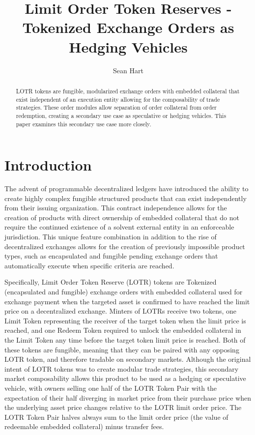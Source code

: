 \documentclass[12pt]{article}
\title{Limit Order Token Reserves - Tokenized Exchange Orders as Hedging Vehicles}
\author{Sean Hart}
\begin{document}
   \maketitle

   \begin{abstract}
      LOTR tokens are fungible, modularized exchange orders with embedded collateral that exist independent of an execution entity allowing for the composability of trade strategies. These order modules allow separation of order collateral from order redemption, creating a secondary use case as speculative or hedging vehicles. This paper examines this secondary use case more closely.
   \end{abstract}

   \section*{Introduction}
   The advent of programmable decentralized ledgers have introduced the ability to create highly complex fungible structured products that can exist independently from their issuing organization. This contract independence allows for the creation of products with direct ownership of embedded collateral that do not require the continued existence of a solvent external entity in an enforceable jurisdiction. This unique feature combination in addition to the rise of decentralized exchanges allows for the creation of previously impossible product types, such as encapsulated and fungible pending exchange orders that automatically execute when specific criteria are reached.

   Specifically, Limit Order Token Reserve (LOTR) tokens are Tokenized (encapsulated and fungible) exchange orders with embedded collateral used for exchange payment when the targeted asset is confirmed to have reached the limit price on a decentralized exchange. Minters of LOTRs receive two tokens, one Limit Token representing the receiver of the target token when the limit price is reached, and one Redeem Token required to unlock the embedded collateral in the Limit Token any time before the target token limit price is reached. Both of these tokens are fungible, meaning that they can be paired with any opposing LOTR token, and therefore tradable on secondary markets. Although the original intent of LOTR tokens was to create modular trade strategies, this secondary market composability allows this product to be used as a hedging or speculative vehicle, with owners selling one half of the LOTR Token Pair with the expectation of their half diverging in market price from their purchase price when the underlying asset price changes relative to the LOTR limit order price. The LOTR Token Pair halves always sum to the limit order price (the value of redeemable embedded collateral) minus transfer fees.
\end{document}
